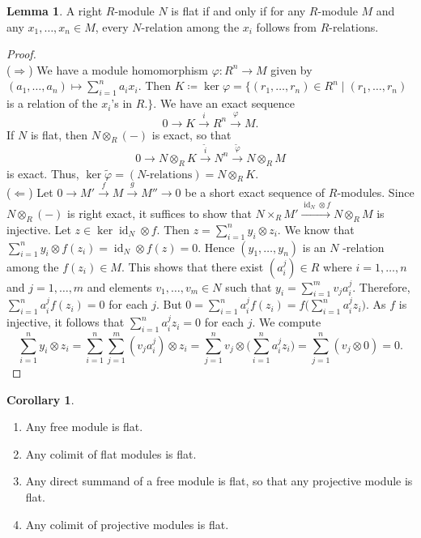 \documentclass[10pt,letterpaper,cm]{nupset}
\theoremstyle{definition}
\newtheorem{corollary}{Corollary}
\newtheorem{lemma}{Lemma}
\newcommand{\1}{\mathbf{1}}
\newcommand{\0}{\vec 0}
\DeclareMathOperator{\id}{id}
\begin{document}
\begin{lemma}
A right $R$-module $N$ is flat if and only if for any $R$-module $M$ and any $x_1, \ldots, x_n \in M$, every $N$-relation among the $x_i$ follows from $R$-relations. 
\end{lemma}
\begin{proof} $ $
\\
($\Longrightarrow$) We have a module homomorphism $\varphi : R^n \to M$ given by $(a_1, \ldots, a_n)\mapsto \sum_{i=1}^na_ix_i$. Then $K\coloneqq  \ker{\varphi}= \{(r_1, \ldots, r_n)\in R^n \mid (r_1, \ldots, r_n)$ is a relation of the $x_i$'s in $R.\}$. We have an exact sequence $$ 0 \to K \overset{i}{\longrightarrow} R^n \overset{\varphi}{\longrightarrow} M  .$$ If $N$ is flat, then $N\otimes_R (-)$ is exact, so that $$ 0 \to N\otimes_R K \overset{\tilde{i}}{\longrightarrow} N^n \overset{\tilde{\varphi}}{\longrightarrow} N\otimes_R M  $$ is exact. Thus, $\ker{\tilde{\varphi}} = (N\text{-relations}) = N\otimes_R K$.
\\ ($\Longleftarrow$) Let $0 \to M' \overset{f}{\longrightarrow}  M  \overset{g}{\longrightarrow} M'' \to 0$ be a short exact sequence of $R$-modules. Since $N \otimes_R (-)$ is right exact, it suffices to show that $N \times_R M' \overset{\id_N \otimes f}{\longrightarrow} N\otimes_RM$ is injective. Let $z\in \ker{\id_N \otimes f}$. Then $z= \sum_{i=1}^n y_i \otimes z_i$. We know that $\sum_{i=1}^n y_i \otimes f(z_i) = \id_N \otimes f(z) =0$. Hence $(y_1, \ldots, y_n)$ is an $N$ -relation among the $f(z_i)\in M$. This shows that there exist $(a_i^j) \in R$ where $i=1, \ldots, n$ and $j=1, \ldots, m$ and elements $v_1, \ldots, v_m \in N$ such that $y_i = \sum_{i=1}^m v_ja_i^j$. Therefore, $\sum_{i=1}^n a_i^jf(z_i) = 0$ for each $j$. But $0 = \sum_{i=1}^n a_i^j f(z_i) = f\big (\sum_{i=1}^n a_i^j z_i \big )$. As $f$ is injective, it follows that $\sum_{i=1}^n a_i^jz_i = 0$ for each $j$. We compute $$\sum_{i=1}^n y_i \otimes z_i = \sum_{i=1}^n \sum_{j=1}^m (v_ja_i^j) \otimes z_i = \sum_{j=1}^n v_j \otimes \big (\sum_{i=1}^n a_i^j z_i \big ) = \sum_{j=1}^n (v_j \otimes 0) = 0.$$
\end{proof}

\begin{corollary} $ $
\begin{enumerate}
\item Any free module is flat.
\item Any colimit of flat modules is flat.
\item Any direct summand of a free module is flat, so that any projective module is flat.
\item Any colimit of projective modules is flat. 
\end{enumerate}
\end{corollary}
\end{document}
